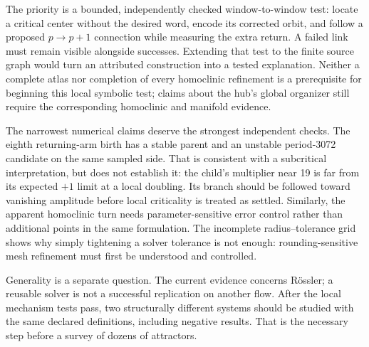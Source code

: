 The priority is a bounded, independently checked window-to-window test:
locate a critical center without the desired word, encode its corrected
orbit, and follow a proposed $p\to p+1$ connection while measuring the
extra return. A failed link must remain visible alongside successes.
Extending that test to the finite source graph would turn an attributed
construction into a tested explanation. Neither a complete atlas nor
completion of every homoclinic refinement is a prerequisite for beginning
this local symbolic test; claims about the hub's global organizer still
require the corresponding homoclinic and manifold evidence.

The narrowest numerical claims deserve the strongest independent checks.
The eighth returning-arm birth has a stable parent and an unstable
period-3072 candidate on the same sampled side. That is consistent with a
subcritical interpretation, but does not establish it: the child's multiplier
near 19 is far from its expected
$+1$ limit at a local doubling. Its branch should be followed toward
vanishing amplitude before local criticality is treated as settled.
Similarly, the apparent homoclinic turn needs parameter-sensitive error
control rather than additional points in the same formulation. The
incomplete radius--tolerance grid shows why simply tightening a solver
tolerance is not enough: rounding-sensitive mesh refinement must first
be understood and controlled.

Generality is a separate question. The current evidence concerns R{\"o}ssler;
a reusable solver is not a successful replication on another flow.
After the local mechanism tests pass, two structurally different systems
should be studied with the same declared definitions, including negative
results. That is the necessary step before a survey of dozens of attractors.
